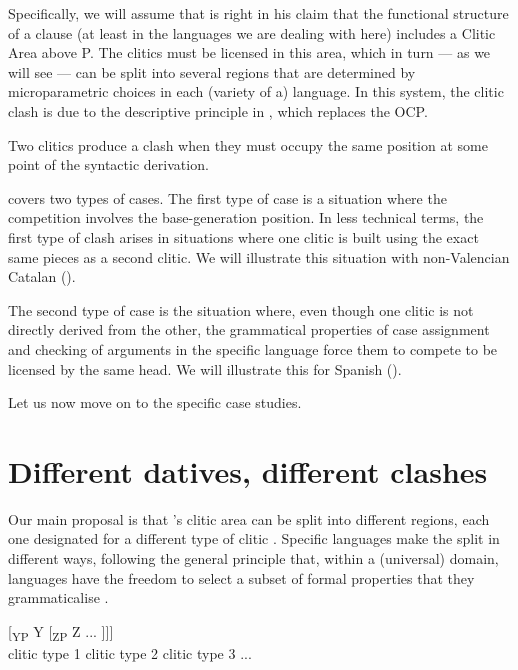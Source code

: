 \documentclass[output=paper,modfonts,nonflat,newtxmath,colorlinks,citecolor=brown]{langsci/langscibook}
\begin{document}
 \label{ex:cabre:6}
    \z


Specifically, we will assume that \citet{Sportiche1996} is right in his claim that the functional structure of a clause (at least in the languages we are dealing with here) includes a Clitic Area above {\liv}P. The clitics must be licensed in this area, which in turn — as we will see — can be split into several regions that are determined by microparametric choices in each (variety of a) language. In this system, the clitic clash is due to the descriptive principle in , which replaces the OCP.

\ea%
\label{ex:cabre:7}
    Two clitics produce a clash when they must occupy the same   position at some point of the syntactic derivation.
    \z




 covers two types of cases. The first type of case is a situation where the competition involves the base-generation position. In less technical terms, the first type of clash arises in situations where one clitic is built using the exact same pieces as a second clitic. We will illustrate this situation with non-Valencian Catalan ().

The second type of case is the situation where, even though one clitic is not directly derived from the other, the grammatical properties of case assignment and checking of arguments in the specific language force them to compete to be licensed by the same head. We will illustrate this for Spanish ().

Let us now move on to the specific case studies.

\section{Different datives, different clashes} %
\label{sec:cabre:3}

Our main proposal is that \citeauthor{Sportiche1996}’s clitic area can be split into different regions, each one designated for a different type of clitic . Specific languages make the split in different ways, following the general principle that, within a (universal) domain, languages have the freedom to select a subset of formal properties that they grammaticalise \citep{RamchandSvenonius2014, Wiltschko2014}.

\ea%
    \label{ex:cabre:8}
    \gll {[\textsubscript{XP} X} { } {[\textsubscript{YP} Y} { }  {[\textsubscript{ZP}  Z} ...  ]]]\\
        \footnotesize {clitic type 1} { } \footnotesize {clitic type 2} { } \footnotesize   {clitic type 3} ...\\
    \glt
    \z
\end{document}
